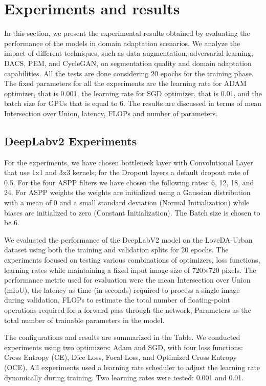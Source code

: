 \documentclass[10pt,twocolumn,letterpaper]{article}
\begin{document}
\section{Experiments and results}
\label{sec:experiments}

In this section, we present the experimental results obtained by evaluating the performance of the models in domain adaptation scenarios. We analyze the impact of different techniques, such as data augmentation, adversarial learning, DACS, PEM, and CycleGAN, on segmentation quality and domain adaptation capabilities. All the tests are done considering 20 epochs for the training phase. The fixed parameters for all the experiments are the learning rate for ADAM optimizer, that is 0.001, the learning rate for SGD optimizer, that is 0.01, and the batch size for GPUs that is equal to 6.  The results are discussed in terms of mean Intersection over Union, latency, FLOPs and number of parameters. 

\subsection{DeepLabv2 Experiments}
For the experiments, we have chosen bottleneck layer with Convolutional Layer that use 1x1 and 3x3 kernels; for the Dropout layers a default dropout rate of 0.5. For the four ASPP filters we have chosen the following rates: 6, 12, 18, and 24. For ASPP weights the weights are initialized using a Gaussian distribution with a mean of 0 and a small standard deviation (Normal Initialization) while biases are initialized to zero (Constant Initialization). The Batch size is chosen to be 6.

We evaluated the performance of the DeepLabV2 model on the LoveDA-Urban dataset using both the training and validation splits for 20 epochs. The experiments focused on testing various combinations of optimizers, loss functions, learning rates while maintaining a fixed input image size of 
720×720 pixels. The performance metric used for evaluation were the mean Intersection over Union (mIoU), the latency as time (in seconds) required to process a single image during validation, FLOPs to estimate the total number of floating-point operations required for a forward pass through the network, Parameters as the total number of trainable parameters in the model.

The configurations and results are summarized in the Table. We conducted experiments using two optimizers: Adam and SGD, with four loss functions: Cross Entropy (CE), Dice Loss, Focal Loss, and Optimized Cross Entropy (OCE). All experiments used a learning rate scheduler to adjust the learning rate dynamically during training. Two learning rates were tested: 0.001 and 0.01.
\end{document}
